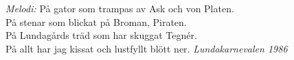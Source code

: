 {\footnotesize\textit{Melodi: }}
\vspace{10pt}
På gator som trampas av Ask och von Platen.\\
På stenar som blickat på Broman, Piraten.\\
På Lundagårds träd som har skuggat Tegnér.\\
På allt har jag kissat och lustfyllt blött ner.
\vspace{10pt}
{\footnotesize\textit{Lundakarnevalen 1986}}
